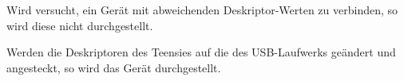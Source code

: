 \lstset{language=log}


Wird versucht, ein Gerät mit abweichenden Deskriptor-Werten zu verbinden, so wird diese nicht durchgestellt.



Werden die Deskriptoren des Teensies auf die des USB-Laufwerks geändert und angesteckt, so wird das Gerät durchgestellt.

